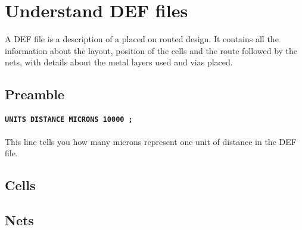 \section{Understand DEF files}
A DEF file is a description of a placed on routed design.
It contains all the information about the layout, position of the cells and the route followed by the nets, with details about the metal layers used and vias placed.

\subsection{Preamble}
\paragraph{\texttt{UNITS DISTANCE MICRONS 10000 ;}}
This line tells you how many microns represent one unit of distance in the DEF file.

\subsection{Cells}

\subsection{Nets}